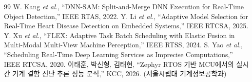 \documentclass[10pt]{article}
\begin{document}
\begin{thebibliography}{99}
 W. Kang \emph{et al.}, ``DNN-SAM: Split-and-Merge DNN Execution for Real-Time Object Detection,'' IEEE RTAS, 2022.
 Y. Li \emph{et al.}, ``Adaptive Model Selection for Real-Time Heart Disease Detection on Embedded Systems,'' IEEE RTCSA, 2025.
 Y. Xu \emph{et al.}, ``FLEX: Adaptive Task Batch Scheduling with Elastic Fusion in Multi-Modal Multi-View Machine Perception,'' IEEE RTSS, 2024.
 S. Yao \emph{et al.}, ``Scheduling Real-Time Deep Learning Services as Imprecise Computations,'' IEEE RTCSA, 2020.
 이태훈, 박신형, 김태현, ``Zephyr RTOS 기반 MCU에서의 실시간 기계 결함 진단 추론 성능 분석,'' KCC, 2026. (서울시립대 기계정보공학과)
\end{thebibliography}
\end{document}
